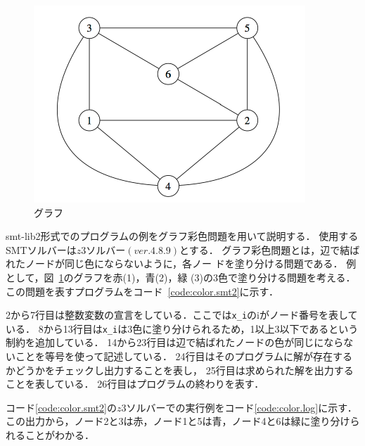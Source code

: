 %
%
\begin{figure}[tb]
  \centering
  \includegraphics[width=0.6\linewidth]{fig/graph3.pdf}
  \caption{グラフ}
  \label{fig:graph}
\end{figure}
smt-lib2形式でのプログラムの例をグラフ彩色問題を用いて説明する．
使用するSMTソルバーは$z3ソルバー(ver.4.8.9)$とする．
グラフ彩色問題とは，辺で結ばれたノードが同じ色にならないように，各ノー
ドを塗り分ける問題である．
例として，図~\ref{fig:graph}のグラフを赤(1)，青(2)，緑
(3)の3色で塗り分ける問題を考える．
この問題を表すプログラムをコード~\ref{code:color.smt2}に示す．

2から7行目は整数変数の宣言をしている．ここでは\verb|x_i|のiがノード番号を表している．
8から13行目は\verb|x_i|は3色に塗り分けられるため，1以上3以下であるという制約を追加している．
14から23行目は辺で結ばれたノードの色が同じにならないことを等号を使って記述している．
24行目はそのプログラムに解が存在するかどうかをチェックし出力することを表し，
25行目は求められた解を出力することを表している．
26行目はプログラムの終わりを表す．

コード\ref{code:color.smt2}の$z3ソルバー$での実行例をコード\ref{code:color.log}に示す．
この出力から，ノード2と3は赤，ノード1と5は青，ノード4と6は緑に塗り分けられることがわかる．






